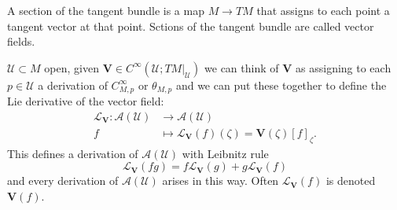 A section of the tangent bundle is a map $M\to TM$ that assigns to each point a tangent vector at that point. Sctions of the tangent bundle are called vector fields.
\begin{example}
  $\mathcal{U}\subset M$ open, given $\mathbf{V}\in C^{\infty}\left( \mathcal{U};TM|_{\mathcal{U}} \right) $ we can think of $\mathbf{V}$ as assigning to each $p\in \mathcal{U}$ a derivation of $C^{\infty}_{M,p}$ or $\theta _{M,p}$ and we can put these together to define the Lie derivative of the vector field:
  \begin{align*}
    \mathcal{L}_{\mathbf{V}}: \mathcal{A}(\mathcal{U}) &\longrightarrow \mathcal{A}(\mathcal{U}) \\
    f &\longmapsto \mathcal{L}_{\mathbf{V}}(f)(\zeta )=\mathbf{V}(\zeta )\left[ f \right] _{\zeta }
  .\end{align*}
  This defines a derivation of $\mathcal{A}(\mathcal{U})$ with Leibnitz rule 
  \[
    \mathcal{L}_{\mathbf{V}}\left( fg \right) =f\mathcal{L}_{\mathbf{V}}(g)+g\mathcal{L}_{\mathbf{V}}(f)
  \] 
  and every derivation of $\mathcal{A}(\mathcal{U})$ arises in this way. Often $\mathcal{L}_{\mathbf{V}}(f)$ is denoted $\mathbf{V}(f)$. 
  

\end{example}
